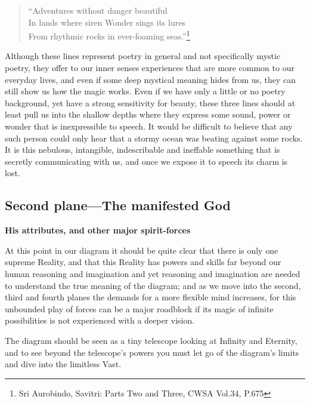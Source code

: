\documentclass[12pt,a4paper]{book}
\begin{document}
\begin{verse}
``Adventures without danger beautiful\\
In lands where siren Wonder sings its lures\\
From rhythmic rocks in ever-foaming seas.''\footnote{Sri Aurobindo, Savitri: Parts Two and Three, CWSA Vol.34, P.675}
\end{verse}

Although these lines represent poetry in general and not specifically
mystic poetry, they offer to our inner senses experiences that are
more common to our everyday lives, and even if some deep mystical
meaning hides from us, they can still show us how the magic
works. Even if we have only a little or no poetry background, yet have
a strong sensitivity for beauty, these three lines should at least
pull us into the shallow depths where they express some sound, power
or wonder that is inexpressible to speech. It would be difficult to
believe that any such person could only hear that a stormy ocean was
beating against some rocks. It is this nebulous, intangible,
indescribable and ineffable something that is secretly communicating
with us, and once we expose it to speech its charm is lost.


\newpage
\begin{center}\section*{Second plane---The manifested God}\end{center}

\begin{center}{\bf His attributes, and other major spirit-forces}\end{center}



At this point in our diagram it should be quite clear that there is
only one supreme Reality, and that this Reality has powers and skills
far beyond our human reasoning and imagination and yet reasoning and
imagination are needed to understand the true meaning of the diagram;
and as we move into the second, third and fourth planes the demands
for a more flexible mind increases, for this unbounded play of forces
can be a major roadblock if its magic of infinite possibilities is not
experienced with a deeper vision.

The diagram should be seen as a tiny telescope looking at Infinity and
Eternity, and to see beyond the telescope's powers you must let go of
the diagram's limits and dive into the limitless Vast.
\end{document}
